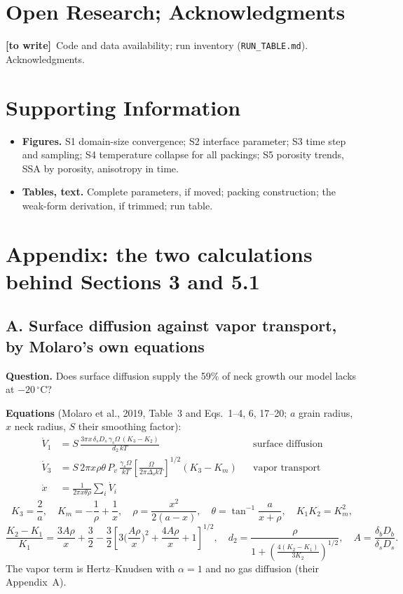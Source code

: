 \documentclass[11pt]{article}
\newcommand{\Miss}{\textcolor{miss}{\textbf{[to write]}}\ }
\begin{document}
\section*{Open Research; Acknowledgments}
\Miss Code and data availability; run inventory (\texttt{RUN\_TABLE.md}).
Acknowledgments.

\section*{Supporting Information}
\begin{itemize}
\item \textbf{Figures.} S1 domain-size convergence; S2 interface parameter;
  S3 time step and sampling; S4 temperature collapse for all packings; S5
  porosity trends, SSA by porosity, anisotropy in time.
\item \textbf{Tables, text.} Complete parameters, if moved; packing
  construction; the weak-form derivation, if trimmed; run table.
\end{itemize}

\section*{Appendix: the two calculations behind Sections 3 and 5.1}

\subsection*{A. Surface diffusion against vapor transport, by Molaro's own equations}

\textbf{Question.} Does surface diffusion supply the 59\% of neck growth our
model lacks at $-20\,^{\circ}$C?

\textbf{Equations} (Molaro et al., 2019, Table~3 and Eqs.~1--4, 6, 17--20;
$a$ grain radius, $x$ neck radius, $S$ their smoothing factor):
\begin{align*}
\dot V_1 &= S\,\frac{3\pi x\,\delta_sD_s\,\gamma_s\Omega\,(K_3 - K_2)}{d_2\,kT} && \text{surface diffusion}\\
\dot V_3 &= S\,2\pi x\rho\theta\,P_v\,\frac{\gamma_s\Omega}{kT}\left[\frac{\Omega}{2\pi\Delta_o kT}\right]^{1/2}(K_3 - K_m) && \text{vapor transport}\\
\dot x &= \frac{1}{2\pi x\theta\rho}\sum_i\dot V_i
\end{align*}
\[
K_3 = \frac{2}{a},\quad K_m = -\frac1\rho + \frac1x,\quad \rho = \frac{x^{2}}{2(a-x)},\quad \theta = \tan^{-1}\frac{a}{x+\rho},\quad K_1K_2 = K_m^{2},
\]
\[
\frac{K_2-K_1}{K_1} = \frac{3A\rho}{x} + \frac32 - \frac32\left[3\Big(\frac{A\rho}{x}\Big)^{2} + \frac{4A\rho}{x} + 1\right]^{1/2},\quad
d_2 = \frac{\rho}{1 + \left(\frac{4(K_2-K_1)}{3K_2}\right)^{1/2}},\quad A = \frac{\delta_bD_b}{\delta_sD_s} .
\]
The vapor term is Hertz--Knudsen with $\alpha = 1$ and no gas diffusion
(their Appendix~A).
\end{document}
